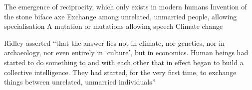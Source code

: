 \begin{parts}
    \begin{choices}
        \choice The emergence of reciprocity, which only exists in modern humans
        \choice Invention of the stone biface axe
        \correctchoice Exchange among unrelated, unmarried people, allowing specialisation
        \choice A mutation or mutations allowing speech
        \choice Climate change
    \end{choices}

    \begin{solution}
        Ridley asserted ``that the answer lies not in climate, nor genetics, nor in archaeology, nor even entirely in `culture',
        but in economics. Human beings had started to do something to and with each other that in effect began to build a collective intelligence.
        They had started, for the very first time, to exchange things between unrelated, unmarried individuals''
    \end{solution}

\end{parts}